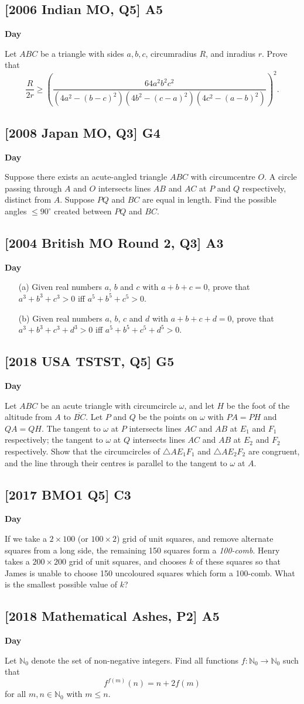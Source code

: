 \documentclass[10pt]{article}
\newcommand{\themonth}{March}
\newcommand{\theyear}{2019}
\newcounter{day}
\newcounter{solution}
\newcounter{datenumber}
\newcommand{\problem}[4][0]{
	\newpage
	\subsection{[#3] \space #2} \hfill 
	{\large\textbf{Day \arabic{day}}} %
	\begin{flushleft} #4 \end{flushleft}
	\vspace{1em}
	\addtocounter{day}{1}
	\addtocounter{datenumber}{1}
	\setcounter{solution}{1}
}
\begin{document}
\problem[105]{A5}{2006 Indian MO, Q5}{Let \(ABC\) be a triangle with sides \(a, b, c\), circumradius \(R\), and inradius \(r\). Prove that
	\[\frac{R}{2r} \geq \left ( \frac{64a^2b^2c^2}{(4a^2-(b-c)^2)(4b^2-(c-a)^2)(4c^2-(a-b)^2)} \right )^2.\]}

\problem[106]{G4}{2008 Japan MO, Q3}{Suppose there exists an acute-angled triangle \(ABC\) with circumcentre \(O\). A circle passing through \(A\) and \(O\) intersects lines \(AB\) and \(AC\) at \(P\) and \(Q\) respectively, distinct from \(A\). Suppose \(PQ\) and \(BC\) are equal in length. Find the possible angles \(\leq 90^{\circ}\) created between \(PQ\) and \(BC\).}

\problem[107]{A3}{2004 British MO Round 2, Q3}{\begin{itemize}
		\item[(a)] Given real numbers $a$, $b$ and $c$ with $a+b+c=0$, prove that $a^3+b^3+c^3>0$ iff $a^5+b^5+c^5>0$. 
		\item[(b)] Given real numbers $a$, $b$, $c$ and $d$ with $a+b+c+d=0$, prove that $a^3+b^3+c^3+d^3>0$ iff $a^5+b^5+c^5+d^5>0$.
	\end{itemize}}

\problem[108]{G5}{2018 USA TSTST, Q5}{Let \(ABC\) be an acute triangle with circumcircle \(\omega\), and let \(H\) be the foot of the altitude from \(A\) to \(\overline{BC}\). Let \(P\) and \(Q\) be the points on \(\omega\) with \(PA = PH\) and \(QA = QH\). The tangent to \(\omega\) at \(P\) intersects lines \(AC\) and \(AB\) at \(E_1\) and \(F_1\) respectively; the tangent to \(\omega\) at \(Q\) intersects lines \(AC\) and \(AB\) at \(E_2\) and \(F_2\) respectively. Show that the circumcircles of \(\triangle AE_1F_1\) and \(\triangle AE_2F_2\) are congruent, and the line through their centres is parallel to the tangent to \(\omega\) at \(A\).}

\problem[109]{C3}{2017 BMO1 Q5}{If we take a \(2 \times 100\) (or \(100 \times 2\)) grid of unit squares, and remove alternate squares from a long side, the remaining 150 squares form a \textit{100-comb}. Henry takes a \(200 \times 200\) grid of unit squares, and chooses \(k\) of these squares so that James is unable to choose 150 uncoloured squares which form a 100-comb. What is the smallest possible value of \(k\)?}

\problem[110]{A5}{2018 Mathematical Ashes, P2}{Let \(\mathbb{N}_0\) denote the set of non-negative integers. Find all functions \(f:\mathbb{N}_0\to\mathbb{N}_0\) such that
	\[f^{f(m)}(n) = n + 2f(m)\]
	for all \(m,n \in \mathbb{N}_0\) with \(m \leq n\).}
\end{document}
